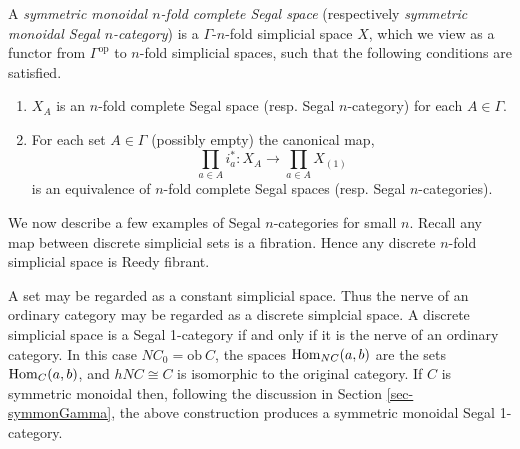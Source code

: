\documentclass{amsart}
\begin{document}
\begin{definition}
	A {\em symmetric monoidal $n$-fold complete Segal space} (respectively {\em symmetric monoidal Segal $n$-category}) is a $\Gamma$-$n$-fold simplicial space $X$, which we view as a functor from $\Gamma^\textrm{op}$ to $n$-fold simplicial spaces, such that the following conditions are satisfied. 
	\begin{enumerate}
		\item $X_A$ is an $n$-fold complete Segal space (resp. Segal $n$-category) for each $A \in \Gamma$. 
		\item For each set $A \in \Gamma$ (possibly empty) the canonical map,
		\begin{equation*}
			\prod_{a \in A} i_a^*: X_A \to \prod_{a \in A} X_{(1)}
		\end{equation*}
		is an equivalence of $n$-fold complete Segal spaces (resp. Segal $n$-categories). 
	\end{enumerate}
\end{definition}


\noindent We now describe a few examples of Segal $n$-categories for small $n$. Recall any map between discrete simplicial sets is a fibration. Hence any discrete $n$-fold simplicial space is Reedy fibrant.




\begin{example}
	A set may be regarded as a constant simplicial space. Thus the nerve of an ordinary category may be regarded as a discrete simplcial space. A discrete simplicial space is a Segal 1-category if and only if it is the nerve of an ordinary category. In this case $NC_0 = \textrm{ob}\ C$, the spaces $\operatorname{Hom}_{NC}(a,b)$ are the sets $\operatorname{Hom}_C(a,b)$, and $\mathit{h}NC \cong C$ is isomorphic to the original category. If $C$ is symmetric monoidal then, following the discussion in Section \ref{sec-symmonGamma}, the above construction produces a symmetric monoidal Segal 1-category. 
\end{example}
\end{document}
